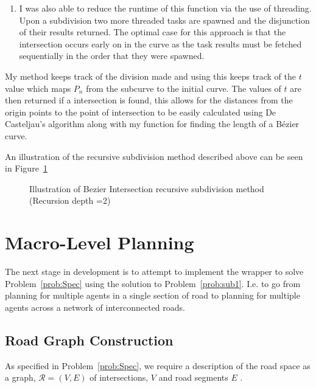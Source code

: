\begin{enumerate}
  \item I was also able to reduce the runtime of this function via the use of threading. Upon a subdivision two more threaded tasks are spawned and the disjunction of their results returned. The optimal case for this approach is that the intersection occurs early on in the curve as the task results must be fetched sequentially in the order that they were spawned. 

\end{enumerate}

My method keeps track of the division made and using this keeps track of the $t$ value which maps $P_{n}$ from the subcurve to the initial curve. The values of $t$ are then returned if a intersection is found, this allows for the distances from the origin points to the point of intersection to be easily calculated using De Casteljau's algorithm along with my function for finding the length of a Bézier curve.

An illustration of the recursive subdivision method described above can be seen in Figure~\ref{fig:bezIntIllustration}

\begin{figure}
\begin{turn}{90}

\end{turn}
\caption{\label{fig:bezIntIllustration} Illustration of Bezier Intersection recursive subdivision method (Recursion depth =2)}
\end{figure}

\section{Macro-Level Planning} 

The next stage in development is to attempt to implement the wrapper to solve Problem~\ref{prob:Spec} using the solution to Problem~\ref{prob:sub1}. I.e. to go from planning for multiple agents in a single section of road to planning for multiple agents across a network of interconnected roads.

\subsection{Road Graph Construction }

As specified in Problem~\ref{prob:Spec}, we require a description of the road space as a graph, $\mathcal{R}= (V,E)$ of intersections, $V$ and road segments $E$
.

